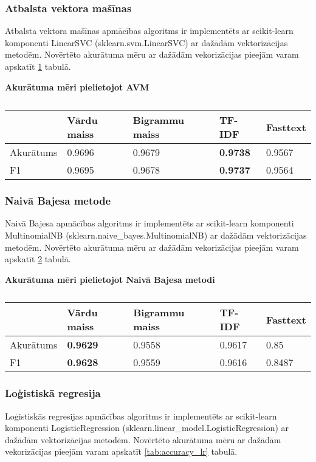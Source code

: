 \subsubsection{Atbalsta vektora mašīnas}
Atbalsta vektora mašīnas apmācības algoritms ir implementēts ar scikit-learn komponenti LinearSVC (sklearn.svm.LinearSVC) ar dažādām vektorizācijas metodēm. Novērtēto akurātuma mēru ar dažādām vekorizācijas pieejām varam apskatīt \ref{tab:accuracy_svm} tabulā.
\begin{table}[H]
\centering
\caption{\label{tab:accuracy_svm}}
\textbf{Akurātuma mēri pielietojot AVM\\}
\begin{tabular}{|l||l|l|l|l|}
\hline
& Vārdu maiss & Bigrammu maiss & TF-IDF & Fasttext \\ \hline
Akurātums & 0.9696 & 0.9679 & \textbf{0.9738} & 0.9567 \\ \hline
F1 & 0.9695 & 0.9678 & \textbf{0.9737} & 0.9564 \\ \hline
\end{tabular}
\end{table}

\subsubsection{Naivā Bajesa metode}
Naivā Bajesa apmācības algoritms ir implementēts ar scikit-learn komponenti MultinomialNB (sklearn.naive\_bayes.MultinomialNB) ar dažādām vektorizācijas metodēm. Novērtēto akurātuma mēru ar dažādām vekorizācijas pieejām varam apskatīt \ref{tab:accuracy_nb} tabulā.
\begin{table}[H]
\centering
\caption{\label{tab:accuracy_nb}}
\textbf{Akurātuma mēri pielietojot Naivā Bajesa metodi\\}
\begin{tabular}{|l||l|l|l|l|}
\hline
& Vārdu maiss & Bigrammu maiss & TF-IDF & Fasttext \\ \hline
Akurātums & \textbf{0.9629} & 0.9558 & 0.9617 & 0.85 \\ \hline
F1 & \textbf{0.9628} & 0.9559 & 0.9616 & 0.8487 \\ \hline
\end{tabular}
\end{table}

\subsubsection{Loģistiskā regresija}
Loģistiskās regresijas apmācības algoritms ir implementēts ar scikit-learn komponenti LogisticRegression (sklearn.linear\_model.LogisticRegression) ar dažādām vektorizācijas metodēm. Novērtēto akurātuma mēru ar dažādām vekorizācijas pieejām varam apskatīt \ref{tab:accuracy_lr} tabulā.

